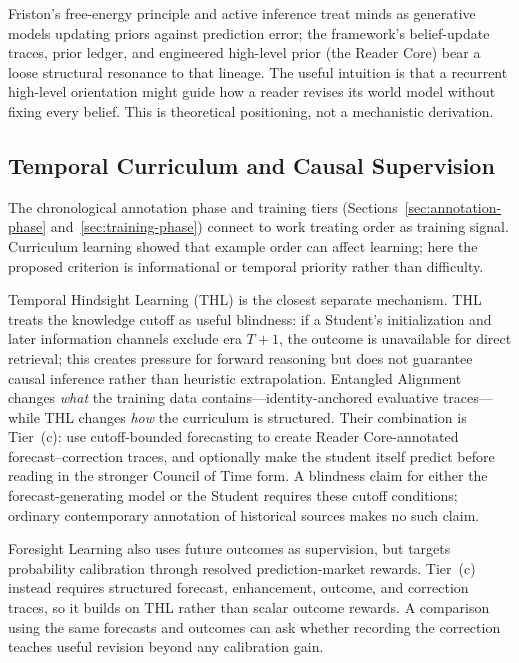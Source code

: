 Friston's free-energy principle and active inference
\cite{friston2010free, parr2019generalised} treat minds as generative models
updating priors against prediction error; the framework's belief-update
traces, prior ledger, and engineered high-level prior (the Reader Core) bear a
loose structural resonance to that lineage. The useful intuition is that a
recurrent high-level orientation might guide how a reader revises its world
model without fixing every belief. This is theoretical positioning, not a
mechanistic derivation.

\subsection{Temporal Curriculum and Causal Supervision}

The chronological annotation phase and training tiers
(Sections~\ref{sec:annotation-phase} and~\ref{sec:training-phase}) connect to
work treating order as training signal. Curriculum learning
\cite{bengio2009curriculum} showed that example order can affect learning; here
the proposed criterion is informational or temporal priority rather than
difficulty.

Temporal Hindsight Learning (THL) \cite{westerberg2026thl} is the closest
separate mechanism. THL treats the knowledge cutoff as useful blindness: if a
Student's initialization and later information channels exclude era $T+1$,
the outcome is unavailable for direct retrieval;
this creates pressure for forward reasoning but does not guarantee causal
inference rather than heuristic extrapolation. Entangled
Alignment changes \emph{what} the training data contains---identity-anchored
evaluative traces---while THL changes \emph{how} the curriculum is structured.
Their combination is Tier~(c): use cutoff-bounded forecasting to create
Reader Core-annotated forecast--correction traces, and optionally make the
student itself predict before reading in the stronger Council of Time form.
A blindness claim for either the forecast-generating model or the Student
requires these cutoff conditions; ordinary contemporary annotation of historical
sources makes no such claim.

Foresight Learning \cite{turtel2025foresight, turtel2025rlvr,
turtel2026futureaslabel} also uses future outcomes as supervision, but targets
probability calibration through resolved prediction-market rewards. Tier~(c)
instead requires structured forecast, enhancement, outcome, and correction
traces, so it builds on THL rather than scalar outcome rewards. A comparison
using the same forecasts and outcomes can ask whether recording the correction
teaches useful revision beyond any calibration gain.

